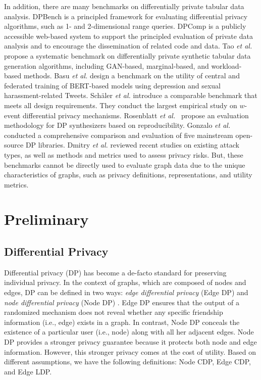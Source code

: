 \documentclass[conference]{IEEEtran}
\theoremstyle{plain}
\begin{document}
In addition, there are many benchmarks on differentially private tabular data analysis.
DPBench \cite{hay2016principled} is a principled framework for evaluating differential privacy algorithms, such as 1- and 2-dimensional range queries.
DPComp \cite{hay2016exploring} is a publicly accessible web-based system to support the principled evaluation of private data analysis and to encourage the dissemination of related code and data.
Tao \textit{et al.} \cite{tao2021benchmarking} propose a systematic benchmark on differentially private synthetic tabular data generation algorithms, including GAN-based, marginal-based, and workload-based methods.
Basu \textit{et al.} \cite{basu2021benchmarking} design a benchmark on the utility of central and federated training of BERT-based models using depression and sexual harassment-related Tweets.
Schäler \textit{et al.} \cite{schaler2023benchmarking} introduce a comparable benchmark that meets all design requirements. They conduct the largest empirical study on $w$-event differential privacy mechanisms.
Rosenblatt \textit{et al.}~\cite{rosenblatt2024epistemic} propose an evaluation methodology for DP synthesizers based on reproducibility.
Gonzalo \textit{et al.} \cite{garrido2021get} conducted a comprehensive comparison and evaluation of five mainstream open-source DP libraries.
Dmitry \textit{et al.}\cite{prokhorenkov2023towards} reviewed recent studies on existing attack types, as well as methods and metrics used to assess privacy risks. 
But, these benchmarks cannot be directly used to evaluate graph data due to the unique characteristics of graphs, such as privacy definitions, representations, and utility metrics.

\section{Preliminary}
\label{sec:preliminary}

\subsection{Differential Privacy}
Differential privacy (DP)  \cite{dwork2014algorithmic,li2016differential} has become a de-facto standard for preserving individual privacy.
In the context of graphs, which are composed of nodes and edges, DP can be defined in two ways: \emph{edge differential privacy} (Edge DP) and \emph{node differential privacy} (Node DP) \cite{hay2009accurate}.
Edge DP ensures that the output of a randomized mechanism does not reveal whether any specific friendship information (i.e., edge) exists in a graph. In contrast, Node DP conceals the existence of a particular user (i.e., node) along with all her adjacent edges. Node DP provides a stronger privacy guarantee because it protects both node and edge information. However, this stronger privacy comes at the cost of utility.
Based on different assumptions, we have the following definitions: Node CDP, Edge CDP, and Edge LDP.
\end{document}
